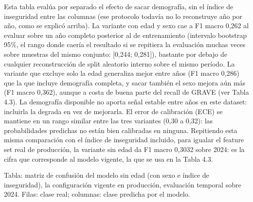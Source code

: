 Esta tabla evalúa por separado el efecto de sacar demografía, sin el
índice de inseguridad entre las columnas (ese protocolo todavía no lo
reconstruye año por año, como se explicó arriba). La variante con edad y
sexo cae a F1 macro 0,262 al evaluar sobre un año completo posterior al
de entrenamiento (intervalo bootstrap 95\%, el rango donde caería el
resultado si se repitiera la evaluación muchas veces sobre muestras del
mismo conjunto: [0,244; 0,281]), bastante por debajo de cualquier
reconstrucción de split aleatorio interno sobre el mismo período. La
variante que excluye solo la edad generaliza mejor entre años (F1 macro
0,286) que la que incluye demografía completa, y sacar también el sexo
mejora aún más (F1 macro 0,362), aunque a costa de buena parte del
recall de GRAVE (ver Tabla 4.3). La demografía disponible no aporta
señal estable entre años en este dataset: incluirla la degrada en vez de
mejorarla. El error de calibración (ECE) se mantiene en un rango similar
entre las tres variantes (0,30 a 0,32): las probabilidades predichas no
están bien calibradas en ninguna. Repitiendo esta misma comparación con
el índice de inseguridad incluido, para igualar el feature set real de
producción, la variante sin edad da F1 macro 0,3032 sobre 2024: es la
cifra que corresponde al modelo vigente, la que se usa en la Tabla 4.3.

Tabla: matriz de confusión del modelo sin edad (con sexo e índice de
inseguridad), la configuración vigente en producción, evaluación
temporal sobre 2024. Filas: clase real; columnas: clase predicha por el
modelo.

